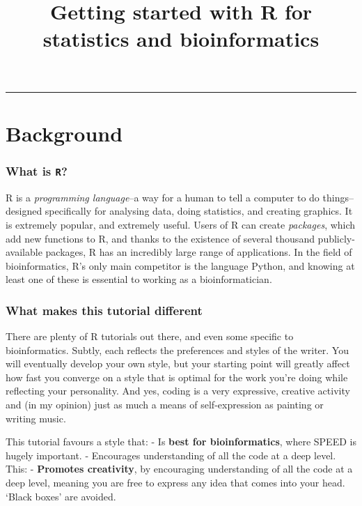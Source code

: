 \documentclass[
]{article}
\title{Getting started with R for statistics and bioinformatics}
\author{}
\date{\vspace{-2.5em}}
\begin{document}
\maketitle

\begin{center}\rule{0.5\linewidth}{0.5pt}\end{center}

\section{Background}\label{background}

\subsubsection{\texorpdfstring{What is
\texttt{R}?}{What is R?}}\label{what-is-r}

R is a \emph{programming language}--a way for a human to tell a computer
to do things--designed specifically for analysing data, doing
statistics, and creating graphics. It is extremely popular, and
extremely useful. Users of R can create \emph{packages}, which add new
functions to R, and thanks to the existence of several thousand
publicly-available packages, R has an incredibly large range of
applications. In the field of bioinformatics, R's only main competitor
is the language Python, and knowing at least one of these is essential
to working as a bioinformatician.

\subsubsection{What makes this tutorial
different}\label{what-makes-this-tutorial-different}

There are plenty of R tutorials out there, and even some specific to
bioinformatics. Subtly, each reflects the preferences and styles of the
writer. You will eventually develop your own style, but your starting
point will greatly affect how fast you converge on a style that is
optimal for the work you're doing while reflecting your personality. And
yes, coding is a very expressive, creative activity and (in my opinion)
just as much a means of self-expression as painting or writing music.

This tutorial favours a style that: - Is \textbf{best for
bioinformatics}, where SPEED is hugely important. - Encourages
understanding of all the code at a deep level. This: - \textbf{Promotes
creativity}, by encouraging understanding of all the code at a deep
level, meaning you are free to express any idea that comes into your
head. `Black boxes' are avoided.
\end{document}
